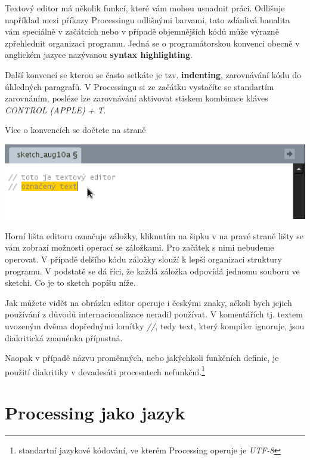 \documentclass[10pt,twopage]{book}
\newcommand{\klavesy}[1]{\textsc{\em #1}}
\newcommand{\slovnik}[1]{\textbf{\gls{#1}}\index{#1}}
\begin{document}
Textový editor má několik funkcí, které vám mohou usnadnit práci. Odlišuje například mezi příkazy Processingu odlišnými barvami, tato zdánlivá banalita vám speciálně v začátcích nebo v případě objemnějších kódů může výrazně zpřehlednit organizaci programu. Jedná se o programátorskou konvenci obecně v anglickém jazyce nazývanou \slovnik{syntax highlighting}.


Další konvencí se kterou se často setkáte je tzv. \slovnik{indenting}, zarovnávání kódu do úhledných paragrafů. V Processingu si ze začátku vystačíte se standartím zarovnáním, posléze lze zarovnávání aktivovat stiskem kombinace kláves \klavesy{CONTROL (APPLE) + T}.

Více o konvencích se dočtete na straně~\pageref{Předmluva}

\begin{center}
\includegraphics[width = 1\textwidth]{imgs/editor.png}
\end{center}

Horní lišta editoru označuje záložky, kliknutím na šipku v na pravé straně lišty se vám zobrazí možnosti operací se záložkami. Pro začátek s nimi nebudeme operovat. V případě delšího kódu záložky slouží k lepší organizaci struktury programu. V podstatě se dá říci, že každá záložka odpovídá jednomu souboru ve sketchi. Co je to sketch popíšu níže.

Jak můžete vidět na obrázku editor operuje i českými znaky, ačkoli bych jejich používání z důvodů internacionalizace neradil používat. V komentářích tj. textem uvozeným dvěma dopřednými lomítky {\em //}, tedy text, který kompiler ignoruje, jsou diakritická znaménka přípustná.

Naopak v případě názvu proměnných, nebo jakýchkoli funkčních definic, je použití diakritiky v devadesáti procesntech nefunkční.\footnote{standartní jazykové kódování, ve kterém Processing operuje je {\em UTF-8}}




\chapter{Processing jako jazyk}
\end{document}
